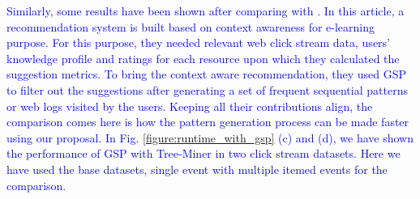 \textcolor{blue}{Similarly, some results have been shown after comparing with \cite{tarus2018hybrid}. In this article, a recommendation system is built based on context awareness for e-learning purpose. For this purpose, they needed relevant web click stream data, users' knowledge profile and ratings for each resource upon which they calculated the suggestion metrics. To bring the context aware recommendation, they used GSP to filter out the suggestions after generating a set of frequent sequential patterns or web logs visited by the users. Keeping all their contributions align, the comparison comes here is how the pattern generation process can be made faster using our proposal. In Fig. \ref{figure:runtime_with_gsp} (c) and (d), we have shown the performance of GSP with Tree-Miner in two click stream datasets. Here we have used the base datasets, single event with multiple itemed events for the comparison.}         
